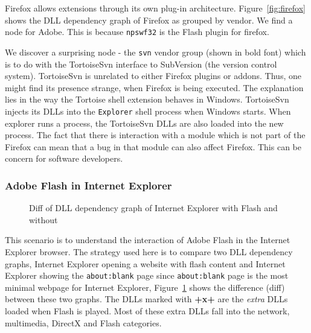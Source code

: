 Firefox allows extensions through its own plug-in architecture.
Figure~\ref{fig:firefox} shows the DLL dependency graph
of Firefox as grouped by vendor. We find a node for Adobe.
This is because {\tt npswf32} is the Flash plugin for firefox.

We discover a surprising node -
the {\tt svn} vendor group (shown in bold font) which is to do with
the TortoiseSvn interface to SubVersion (the version control system).
TortoiseSvn is unrelated to either Firefox plugins or addons.
Thus, one might find its presence strange, when Firefox is being executed.
The explanation lies in the way the Tortoise shell extension
behaves in Windows. TortoiseSvn injects its DLLs into the
{\tt Explorer} shell process when Windows starts.
When explorer runs a process, the TortoiseSvn
DLLs are also loaded into the new process.
The fact that there is interaction with a module which is not part of
the Firefox can mean that a bug in that module can also affect Firefox.
This can be concern for software developers.

\subsubsection{Adobe Flash in Internet Explorer}
\label{sec:flash}

\begin{figure}
\centering
\noindent{}
\caption{Diff of DLL dependency graph of Internet Explorer with Flash and without}
\label{fig:ie-diff}
\end{figure}

This scenario is to understand the interaction of Adobe Flash in
the Internet Explorer browser.
The strategy used here is to compare two DLL dependency graphs,
Internet Explorer opening a website with flash content and
Internet Explorer showing the {\tt about:blank} page since
{\tt about:blank} page is the most minimal webpage for Internet Explorer,
Figure~\ref{fig:ie-diff} shows the difference (diff) between these two
graphs.
The DLLs marked with {\bf +x+} are the {\em extra} DLLs loaded
when Flash is played.
Most of these extra DLLs fall into the
network, multimedia, DirectX and Flash categories.

